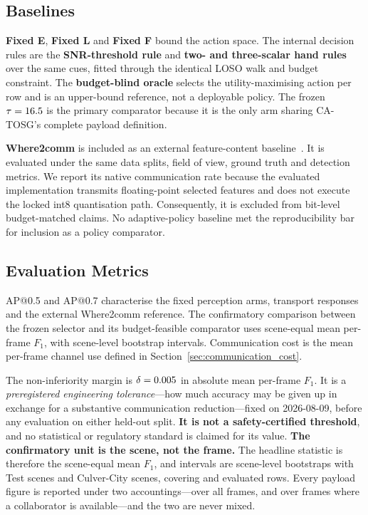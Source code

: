\documentclass[journal]{IEEEtran}
\newcommand{\method}{CA-TOSG}
\begin{document}
\subsection{Baselines}
\textbf{Fixed E}, \textbf{Fixed L} and \textbf{Fixed F} bound the action space. The internal decision
rules are the \textbf{SNR-threshold rule} and \textbf{two- and three-scalar hand rules} over the same
cues, fitted through the identical LOSO walk and budget constraint. The \textbf{budget-blind oracle}
selects the utility-maximising action per row and is an upper-bound reference, not a deployable
policy. The frozen $\tau = 16.5$ is the primary comparator because it is the only arm sharing
\method{}'s complete payload definition.

\textbf{Where2comm} is included as an external feature-content
baseline~\cite{hu2022where2comm}. It is evaluated under the same data splits, field of view, ground
truth and detection metrics. We report
its native communication rate because the evaluated implementation transmits floating-point selected
features and does not execute the locked int8 quantisation path. Consequently, it is excluded from
bit-level budget-matched claims. No adaptive-policy baseline met the reproducibility bar for
inclusion as a policy comparator.

\subsection{Evaluation Metrics}\label{sec:metrics}
AP@0.5 and AP@0.7 characterise the fixed perception arms, transport responses and the external
Where2comm reference. The confirmatory comparison between the frozen selector and its
budget-feasible comparator uses scene-equal mean per-frame $F_1$, with scene-level bootstrap
intervals. Communication cost is the mean per-frame channel use defined in
Section~\ref{sec:communication_cost}.

The non-inferiority margin is $\delta = 0.005$ in absolute mean per-frame $F_1$. It is a
\emph{preregistered engineering tolerance}---how much accuracy may be given up in exchange for a
substantive communication reduction---fixed on 2026-08-09, before any evaluation on either held-out
split. \textbf{It is not a safety-certified threshold}, and no statistical or regulatory standard is
claimed for its value. \textbf{The confirmatory unit is the scene, not the
frame.} The headline statistic is therefore the scene-equal mean $F_1$, and intervals are
scene-level bootstraps with \TestScenes{} Test scenes and \CulverScenes{} Culver-City scenes,
covering \TestRows{} and \CulverRows{} evaluated rows. Every payload figure is reported under two
accountings---over all frames, and over frames where a collaborator is available---and the two are
never mixed.
\end{document}
